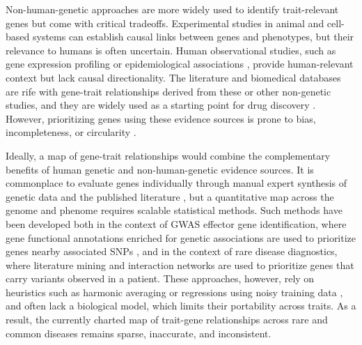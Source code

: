 Non-human-genetic approaches are more widely used to identify trait-relevant genes but come with critical tradeoffs. Experimental studies in animal \cite{seok_genomic_2013,widjaja_inhibiting_2019} and cell-based \cite{ben-david_genetic_2018,canon_clinical_2019} systems can establish causal links between genes and phenotypes, but their relevance to humans is often uncertain. Human observational studies, such as gene expression profiling \cite{wu_integrating_2022,rodriguez_machine_2021} or epidemiological associations \cite{barter_cholesteryl_2011,bhatt_cardiovascular_2019}, provide human-relevant context but lack causal directionality. The literature and biomedical databases are rife with gene-trait relationships derived from these or other non-genetic studies, and they are widely used as a starting point for drug discovery \cite{swinney_how_2011,dornbos_evaluating_2022}. However, prioritizing genes using these evidence sources is prone to bias, incompleteness, or circularity \cite{gillis_assessing_2013,haynes_gene_2018,stoeger_large_2018,tan_caution_2025}.

Ideally, a map of gene-trait relationships would combine the complementary benefits of human genetic and non-human-genetic evidence sources. It is commonplace to evaluate genes individually through manual expert synthesis of genetic data and the published literature \cite{mountjoy_open_2022,karjalainen_genome-wide_2024}, but a quantitative map across the genome and phenome requires scalable statistical methods. Such methods have been developed both in the context of GWAS effector gene identification, where gene functional annotations enriched for genetic associations are used to prioritize genes nearby associated SNPs \cite{pers_biological_2015,weeks_leveraging_2023}, and in the context of rare disease diagnostics, where literature mining \cite{birgmeier_amelie_2020} and interaction networks \cite{smedley_next-generation_2015} are used to prioritize genes that carry variants observed in a patient. These approaches, however, rely on heuristics such as harmonic averaging \cite{buniello_open_2025} or regressions using noisy training data \cite{weeks_leveraging_2023,schipper_prioritizing_2025}, and often lack a biological model, which limits their portability across traits. As a result, the currently charted map of trait-gene relationships across rare and common diseases remains sparse, inaccurate, and inconsistent.


